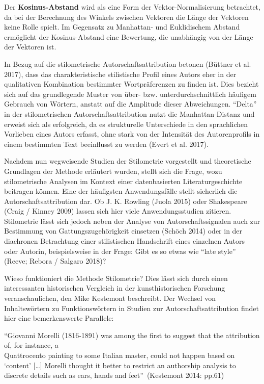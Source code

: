 \documentclass[
  12pt,
  letterpaper,
  DIV=11,
  numbers=noendperiod]{scrreprt}
\begin{document}
Der \textbf{Kosinus-Abstand} wird als eine Form der
Vektor-Normalisierung betrachtet, da bei der Berechnung des Winkels
zwischen Vektoren die Länge der Vektoren keine Rolle spielt. Im
Gegensatz zu Manhattan- und Euklidischem Abstand ermöglicht der
Kosinus-Abstand eine Bewertung, die unabhängig von der Länge der
Vektoren ist.

In Bezug auf die stilometrische Autorschaftsattribution betonen (Büttner
et al. 2017), dass das charakteristische stilistische Profil eines
Autors eher in der qualitativen Kombination bestimmter Wortpräferenzen
zu finden ist. Dies bezieht sich auf das grundlegende Muster von über-
bzw. unterdurchschnittlich häufigem Gebrauch von Wörtern, anstatt auf
die Amplitude dieser Abweichungen. ``Delta'' in der stilometrischen
Autorschaftsattribution nutzt die Manhattan-Distanz und erweist sich als
erfolgreich, da es strukturelle Unterschiede in den sprachlichen
Vorlieben eines Autors erfasst, ohne stark von der Intensität des
Autorenprofils in einem bestimmten Text beeinflusst zu werden (Evert et
al. 2017).

Nachdem nun wegweisende Studien der Stilometrie vorgestellt und
theoretische Grundlagen der Methode erläutert wurden, stellt sich die
Frage, wozu stilometrische Analysen im Kontext einer datenbasierten
Literaturgeschichte beitragen können. Eine der häufigsten
Anwendungsfälle stellt sicherlich die Autorschaftsattribution dar. Ob J.
K. Rowling (Juola 2015) oder Shakespeare (Craig / Kinney 2009) lassen
sich hier viele Anwendungsstudien zitieren.\\
Stilometrie lässt sich jedoch neben der Analyse von Autorschaftssignalen
auch zur Bestimmung von Gattungszugehörigkeit einsetzen (Schöch 2014)
oder in der diachronen Betrachtung einer stilistischen Handschrift eines
einzelnen Autors oder Autorin, beispielsweise in der Frage: Gibt es so
etwas wie ``late style'' (Reeve; Rebora / Salgaro 2018)?

Wieso funktioniert die Methode Stilometrie? Dies lässt sich durch einen
interessanten historischen Vergleich in der kunsthistorischen Forschung
veranschaulichen, den Mike Kestemont beschreibt. Der Wechsel von
Inhaltswörtern zu Funktionswörtern in Studien zur
Autorschaftsattribution findet hier eine bemerkenswerte Parallele:

``Giovanni Morelli (1816-1891) was among the first to suggest that the
attribution of, for instance, a\\
Quattrocento painting to some Italian master, could not happen based on
`content' {[}\ldots{]} Morelli thought it better to restrict an
authorship analysis to discrete details such as ears, hands and
feet''~(Kestemont 2014: pp.61)
\end{document}
